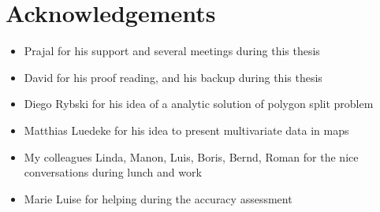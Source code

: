 \chapter*{Acknowledgements}
\label{ch:acknow}
	\begin{itemize}
		\item Prajal for his support and several meetings during this thesis
		\item David for his proof reading, and his backup during this thesis
		\item Diego Rybski for his idea of a analytic solution of polygon split problem
		\item Matthias Luedeke for his idea to present multivariate data in maps
		\item My colleagues Linda, Manon, Luis, Boris, Bernd, Roman for the nice conversations during lunch and work
		\item Marie Luise for helping during the accuracy assessment
	\end{itemize}
